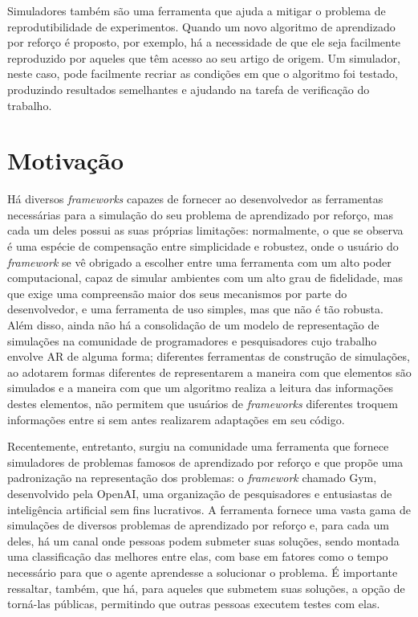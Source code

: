 \documentclass[cic,tc]{iiufrgs}
\begin{document}
Simuladores também são uma ferramenta que ajuda a mitigar o problema de
reprodutibilidade de experimentos. Quando um novo algoritmo de aprendizado
por reforço é proposto, por exemplo, há a necessidade de que ele seja facilmente
reproduzido por aqueles que têm acesso ao seu artigo de origem. Um simulador,
neste caso, pode facilmente recriar as condições em que o algoritmo foi testado,
produzindo resultados semelhantes e ajudando na tarefa de verificação do
trabalho.


\section{Motivação}
Há diversos \textit{frameworks} capazes de fornecer ao desenvolvedor as
ferramentas necessárias para a simulação do seu problema de aprendizado por
reforço, mas cada um deles possui as suas próprias limitações: normalmente, o
que se observa é uma espécie de compensação entre simplicidade e robustez, onde
o usuário do \textit{framework} se vê obrigado a escolher entre uma ferramenta
com um alto poder computacional, capaz de simular ambientes com um alto grau de
fidelidade, mas que exige uma compreensão maior dos seus mecanismos por parte do
desenvolvedor, e uma ferramenta de uso simples, mas que não é tão robusta. Além
disso, ainda não há a consolidação de um modelo de representação de simulações
na comunidade de programadores e pesquisadores cujo trabalho envolve AR de
alguma forma; diferentes ferramentas de construção de simulações, ao adotarem
formas diferentes de representarem a maneira com que elementos são simulados e a
maneira com que um algoritmo realiza a leitura das informações destes elementos,
não permitem que usuários de \textit{frameworks} diferentes troquem informações
entre si sem antes realizarem adaptações em seu código.


Recentemente, entretanto, surgiu na comunidade uma ferramenta que fornece
simuladores de problemas famosos de aprendizado por reforço e que propõe uma
padronização na representação dos problemas: o \textit{framework} chamado Gym,
desenvolvido pela OpenAI, uma organização de pesquisadores e entusiastas
de inteligência artificial sem fins lucrativos. A ferramenta fornece uma vasta
gama de simulações de diversos problemas de aprendizado por reforço e, para
cada um deles, há um canal onde pessoas podem submeter suas soluções, sendo
montada uma classificação das melhores entre elas, com base em fatores como
o tempo necessário para que o agente aprendesse a solucionar o problema. É
importante ressaltar, também, que há, para aqueles que submetem suas soluções,
a opção de torná-las públicas, permitindo que outras pessoas executem testes
com elas.
\end{document}
